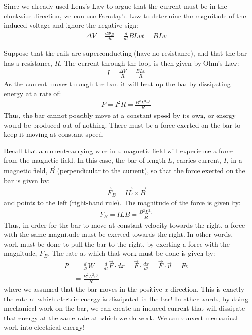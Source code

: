 Since we already used Lenz's Law to argue that the current must be in the clockwise direction, we can use Faraday's Law to determine the magnitude of the induced voltage and ignore the negative sign:
\begin{align*}
\Delta V = \frac{d \Phi_B}{dt}=\frac{d}{dt}BLvt = BLv
\end{align*}

Suppose that the rails are superconducting (have no resistance), and that the bar has a resistance, $R$. The current through the loop is then given by Ohm's Law:
\begin{align*}
I=\frac{\Delta V}{R}=\frac{BLv}{R}
\end{align*}
As the current moves through the bar, it will heat up the bar by dissipating energy at a rate of:
\begin{align*}
P=I^2 R = \frac{B^2L^2v^2}{R}
\end{align*}
Thus, the bar cannot possibly move at a constant speed by its own, or energy would be produced out of nothing. There must be a force exerted on the bar to keep it moving at constant speed. 

Recall that a current-carrying wire in a magnetic field will experience a force from the magnetic field. In this case, the bar of length $L$, carries current, $I$, in a magnetic field, $\vec B$ (perpendicular to the current), so that the force exerted on the bar is given by:
\begin{align*}
\vec F_B = I \vec L \times \vec B
\end{align*}
and points to the left (right-hand rule). The magnitude of the force is given by:
\begin{align*}
F_B = ILB = \frac{B^2L^2v}{R}
\end{align*}
Thus, in order for the bar to move at constant velocity towards the right, a force with the same magnitude must be exerted towards the right. In other words, work must be done to pull the bar to the right, by exerting a force with the magnitude, $F_B$. The rate at which that work must be done is given by:
\begin{align*}
P &= \frac{d}{dt}W=\frac{d}{dt}\vec F \cdot dx=\vec F\cdot \frac{dx}{dt}=\vec F\cdot \vec v = Fv\\
&=\frac{B^2L^2v^2}{R}
\end{align*}
where we assumed that the bar moves in the positive $x$ direction. This is exactly the rate at which electric energy is dissipated in the bar! In other words, by doing mechanical work on the bar, we can create an induced current that will dissipate that energy at the same rate at which we do work. We can convert mechanical work into electrical energy!

